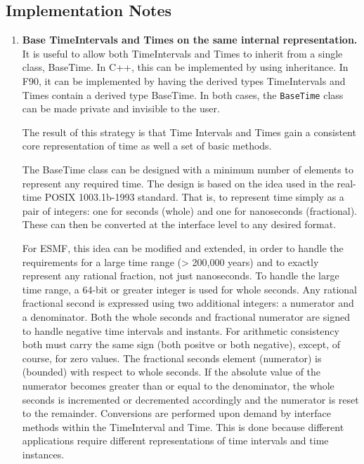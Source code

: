 
\subsection{Implementation Notes}
\begin{enumerate}

\item {\bf Base TimeIntervals and Times on the same internal representation.} 
It is useful to allow both TimeIntervals and Times to 
inherit from a single class, BaseTime.  In C++, this can be
implemented by using inheritance.  In F90, it can be implemented
by having the derived types TimeIntervals and Times
contain a derived type BaseTime.  In both cases, the 
{\tt BaseTime} class can be made private and invisible to the user.

The result of this strategy is that Time Intervals and 
Times gain a consistent core representation of time as well a set
of basic methods.

The BaseTime class can be designed with a minimum number of elements
to represent any required time.  The design is based on the idea used
in the real-time POSIX 1003.1b-1993 standard.  That is, to represent
time simply as a pair of integers: one for seconds (whole) and one for
nanoseconds (fractional).  These can then be converted at the interface
level to any desired format.

For ESMF, this idea can be modified and extended, in order to handle the
requirements for a large time range (> 200,000 years) and to exactly
represent any rational fraction, not just nanoseconds.  To handle the
large time range, a 64-bit or greater integer is used for whole seconds.
Any rational fractional second is expressed using two additional integers:
a numerator and a denominator.  Both the whole seconds and fractional
numerator are signed to handle negative time intervals and instants.
For arithmetic consistency both must carry the same sign (both positve
or both negative), except, of course, for zero values.  The fractional
seconds element (numerator) is 
(bounded) with respect to whole seconds. If the absolute value of the
numerator becomes greater than or equal to the denominator, the whole
seconds is incremented or decremented accordingly and the numerator is
reset to the remainder.  Conversions are performed upon demand by
interface methods within the TimeInterval and
Time.  This is done because different applications require different
representations of time intervals and time instances.


\end{enumerate}
